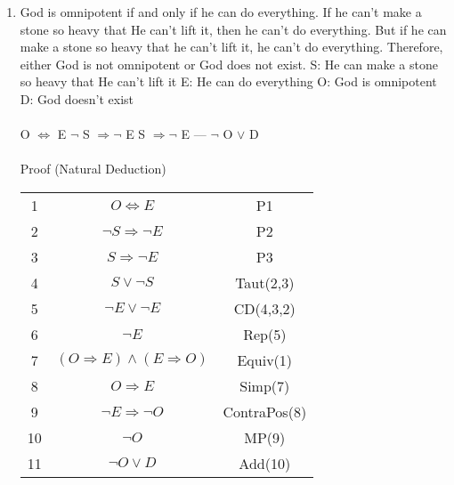 \documentclass[]{article}
\begin{document}
\begin{enumerate}
    \item  God is omnipotent if and only if he can do everything. If he can’t make a stone so heavy that He can’t lift it, then he can’t do everything. But if he can make a stone so heavy that he can’t lift it, he can’t do everything. Therefore, either God is not omnipotent or God does not exist.
    \newline S: He can make a stone so heavy that He can't lift it
    \newline E: He can do everything
    \newline O: God is omnipotent
    \newline D: God doesn't exist
    \\\\ O $\iff$ E
    \newline $\neg$ S $\Rightarrow \neg$ E
    \newline S $\Rightarrow \neg$ E
    \newline ---
    \newline $\neg$ O $\lor$ D
    \\\\ Proof (Natural Deduction)
    \begin{tabular}{c| c | c}
        1 & $O \iff E$ & P1 \\
        2 & $\neg S \Rightarrow \neg E$ & P2 \\
        3 & $S \Rightarrow \neg E$ & P3 \\
        4 & $S \lor \neg S$ & Taut(2,3) \\
        5 & $\neg E \lor \neg E$ & CD(4,3,2) \\
        6 & $\neg E$ & Rep(5) \\
        7 & $(O \Rightarrow E)\land(E\Rightarrow O)$ & Equiv(1) \\
        8 & $O \Rightarrow E$ & Simp(7) \\
        9 & $\neg E \Rightarrow \neg O$ & ContraPos(8) \\
        10 & $\neg O$ & MP(9) \\
        11 & $\neg O \lor D$ & Add(10) \\
    \end{tabular}
    

\end{enumerate}
\end{document}
